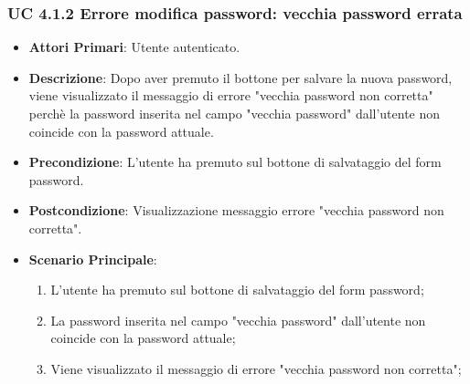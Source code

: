 			\subsubsection{UC 4.1.2 Errore modifica password: vecchia password errata}
			\begin{itemize}
				\item \textbf{Attori Primari}: Utente autenticato.
				\item \textbf{Descrizione}: Dopo aver premuto il bottone per salvare la nuova password, viene visualizzato il messaggio di errore "vecchia password non corretta" perchè la password inserita nel campo "vecchia password" dall'utente non coincide con la password attuale.
				\item \textbf{Precondizione}: L'utente ha premuto sul bottone di salvataggio del form password.
				\item \textbf{Postcondizione}: Visualizzazione messaggio errore "vecchia password non corretta".
				\item \textbf{Scenario Principale}:
				\begin{enumerate}
					\item L'utente ha premuto sul bottone di salvataggio del form password;
					\item La password inserita nel campo "vecchia password" dall'utente non coincide con la password attuale;
					\item Viene visualizzato il messaggio di errore "vecchia password non corretta";
				\end{enumerate}
			\end{itemize}

